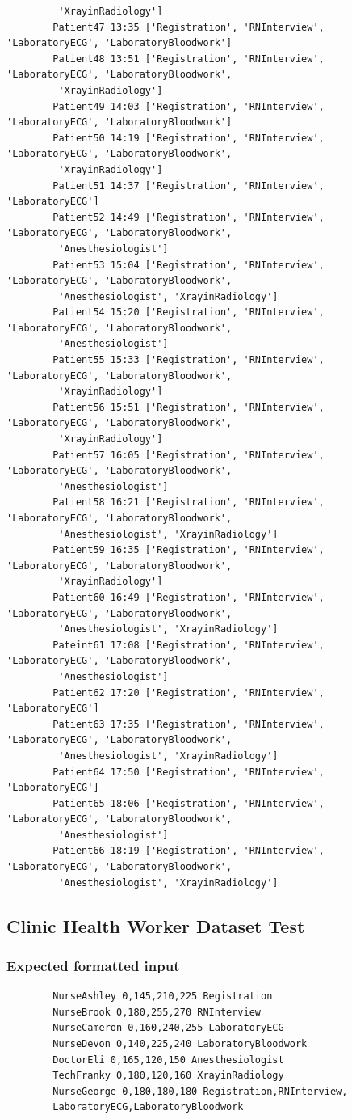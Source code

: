 \documentclass[12pt]{article}
\begin{document}
\begin{verbatim}
		 'XrayinRadiology']
		Patient47 13:35 ['Registration', 'RNInterview', 'LaboratoryECG', 'LaboratoryBloodwork']
		Patient48 13:51 ['Registration', 'RNInterview', 'LaboratoryECG', 'LaboratoryBloodwork',
		 'XrayinRadiology']
		Patient49 14:03 ['Registration', 'RNInterview', 'LaboratoryECG', 'LaboratoryBloodwork']
		Patient50 14:19 ['Registration', 'RNInterview', 'LaboratoryECG', 'LaboratoryBloodwork',
		 'XrayinRadiology']
		Patient51 14:37 ['Registration', 'RNInterview', 'LaboratoryECG']
		Patient52 14:49 ['Registration', 'RNInterview', 'LaboratoryECG', 'LaboratoryBloodwork',
		 'Anesthesiologist']
		Patient53 15:04 ['Registration', 'RNInterview', 'LaboratoryECG', 'LaboratoryBloodwork',
		 'Anesthesiologist', 'XrayinRadiology']
		Patient54 15:20 ['Registration', 'RNInterview', 'LaboratoryECG', 'LaboratoryBloodwork',
		 'Anesthesiologist']
		Patient55 15:33 ['Registration', 'RNInterview', 'LaboratoryECG', 'LaboratoryBloodwork',
		 'XrayinRadiology']
		Patient56 15:51 ['Registration', 'RNInterview', 'LaboratoryECG', 'LaboratoryBloodwork',
		 'XrayinRadiology']
		Patient57 16:05 ['Registration', 'RNInterview', 'LaboratoryECG', 'LaboratoryBloodwork',
		 'Anesthesiologist']
		Patient58 16:21 ['Registration', 'RNInterview', 'LaboratoryECG', 'LaboratoryBloodwork',
		 'Anesthesiologist', 'XrayinRadiology']
		Patient59 16:35 ['Registration', 'RNInterview', 'LaboratoryECG', 'LaboratoryBloodwork',
		 'XrayinRadiology']
		Patient60 16:49 ['Registration', 'RNInterview', 'LaboratoryECG', 'LaboratoryBloodwork',
		 'Anesthesiologist', 'XrayinRadiology']
		Pateint61 17:08 ['Registration', 'RNInterview', 'LaboratoryECG', 'LaboratoryBloodwork',
		 'Anesthesiologist']
		Patient62 17:20 ['Registration', 'RNInterview', 'LaboratoryECG']
		Patient63 17:35 ['Registration', 'RNInterview', 'LaboratoryECG', 'LaboratoryBloodwork',
		 'Anesthesiologist', 'XrayinRadiology']
		Patient64 17:50 ['Registration', 'RNInterview', 'LaboratoryECG']
		Patient65 18:06 ['Registration', 'RNInterview', 'LaboratoryECG', 'LaboratoryBloodwork',
		 'Anesthesiologist']
		Patient66 18:19 ['Registration', 'RNInterview', 'LaboratoryECG', 'LaboratoryBloodwork',
		 'Anesthesiologist', 'XrayinRadiology']
		\end{verbatim}
		
		\subsection{Clinic Health Worker Dataset Test}\label{healthworkerset}
		\subsubsection{Expected formatted input}
		\begin{verbatim}
		NurseAshley 0,145,210,225 Registration
		NurseBrook 0,180,255,270 RNInterview
		NurseCameron 0,160,240,255 LaboratoryECG
		NurseDevon 0,140,225,240 LaboratoryBloodwork
		DoctorEli 0,165,120,150 Anesthesiologist
		TechFranky 0,180,120,160 XrayinRadiology
		NurseGeorge 0,180,180,180 Registration,RNInterview,
		LaboratoryECG,LaboratoryBloodwork
		\end{verbatim}
\end{document}
